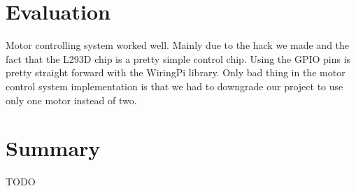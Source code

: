 \documentclass[english,11pt,twoside,a4paper]{article}
\begin{document}
\section{Evaluation}

Motor controlling system worked well. Mainly due to the hack we made and the fact that the L293D chip is a pretty simple control chip. Using the GPIO pins is pretty straight forward with the WiringPi library. Only bad thing in the motor control system implementation is that we had to downgrade our project to use only one motor instead of two.

\section{Summary}

TODO
\end{document}
